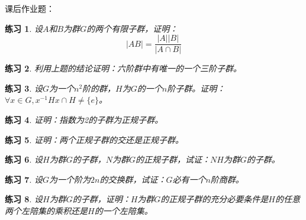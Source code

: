\documentclass{article}
\newtheorem{Exercise}{练习}
\begin{document}
\begin{CJK*}{UTF8}{gbsn}
课后作业题：
\begin{Exercise}
设$A$和$B$为群$G$的两个有限子群，证明：
\[|AB|=\frac{|A||B|}{|A\cap B|}\]
\end{Exercise}
\begin{Exercise}
  利用上题的结论证明：六阶群中有唯一的一个三阶子群。
\end{Exercise}
\begin{Exercise}
设$G$为一个$n^2$阶的群，$H$为$G$的一个$n$阶子群。证明：$\forall x\in G, x^{-1}Hx\cap H \neq \{e\}$。
\end{Exercise}
\begin{Exercise}
证明：指数为2的子群为正规子群。
\end{Exercise}
\begin{Exercise}
证明：两个正规子群的交还是正规子群。
\end{Exercise}
\begin{Exercise}
设$H$为群$G$的子群，$N$为群$G$的正规子群，试证：$NH$为群$G$的子群。
\end{Exercise}
\begin{Exercise}
设$G$为一个阶为$2n$的交换群，试证：$G$必有一个$n$阶商群。
\end{Exercise}
\begin{Exercise}
设$H$为群$G$的子群，证明：$H$为群$G$的正规子群的充分必要条件是$H$的任意两个左陪集的乘积还是$H$的一个左陪集。
\end{Exercise}
\end{CJK*}
\end{document}
